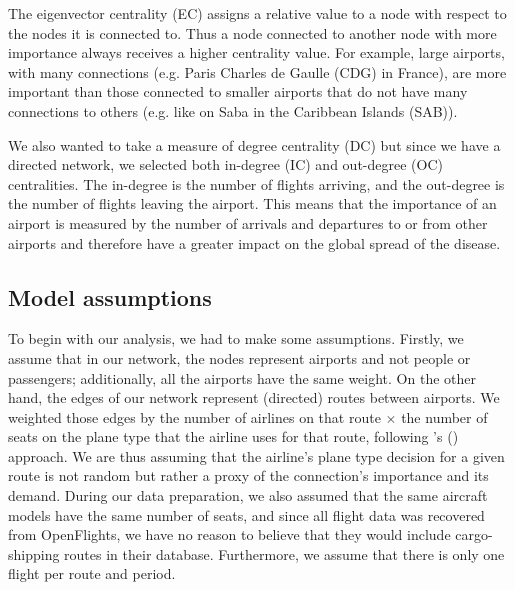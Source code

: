 \documentclass{Template_resources/netsci-project}
\begin{document}
The eigenvector centrality (EC) assigns a relative value to a node with respect to the nodes it is connected to. Thus a node connected to another node with more importance always receives a higher centrality value. For example, large airports, with many connections (e.g. Paris Charles de Gaulle (CDG) in France), are more important than those connected to smaller airports that do not have many connections to others (e.g. like on Saba in the Caribbean Islands (SAB)). 

We also wanted to take a measure of degree centrality (DC) but since we have a directed network, we selected both in-degree (IC) and out-degree (OC) centralities. The in-degree is the number of flights arriving, and the out-degree is the number of flights leaving the airport. This means that the importance of an airport is measured by the number of arrivals and departures to or from other airports and therefore have a greater impact on the global spread of the disease.


\subsection{Model assumptions}
To begin with our analysis, we had to make some assumptions. Firstly, we assume that in our network, the nodes represent airports and not people or passengers; additionally, all the airports have the same weight. On the other hand, the edges of our network represent (directed) routes between airports. We weighted those edges by the number of airlines on that route $\times$ the number of seats on the plane type that the airline uses for that route, following \citeauthor{Lawyer2016}'s (\citeyear{Lawyer2016}) approach. We are thus assuming that the airline's plane type decision for a given route is not random but rather a proxy of the connection's importance and its demand. During our data preparation, we also assumed that the same aircraft models have the same number of seats, and since all flight data was recovered from OpenFlights, we have no reason to believe that they would include cargo-shipping routes in their database. Furthermore, we assume that there is only one flight per route and period.
\end{document}

